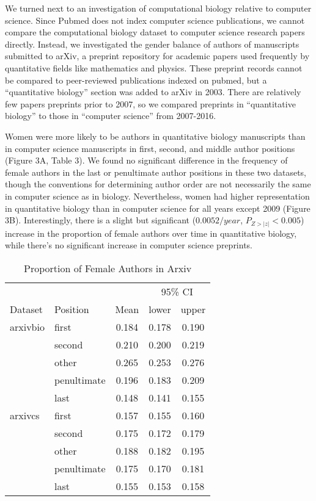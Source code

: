 \documentclass[10pt,letterpaper]{article}
\begin{document}
\begin{flushleft}
We turned next to an investigation of computational biology relative to computer science. Since Pubmed does not index computer science publications, we cannot compare the computational biology dataset to computer science research papers directly. Instead, we investigated the gender balance of authors of manuscripts submitted to arXiv, a preprint repository for academic papers used frequently by quantitative fields like mathematics and physics. These preprint records cannot be compared to peer-reviewed publications indexed on pubmed, but a “quantitative biology” section was added to arXiv in 2003. There are relatively few papers preprints prior to 2007, so we compared preprints in “quantitative biology” to those in “computer science” from 2007-2016.

Women were more likely to be authors in quantitative biology manuscripts than in computer science manuscripts in first, second, and middle author positions (Figure 3A, Table 3). We found no significant difference in the frequency of female authors in the last or penultimate author positions in these two datasets, though the conventions for determining author order are not necessarily the same in computer science as in biology. Nevertheless, women had higher representation in quantitative biology than in computer science for all years except 2009 (Figure 3B). Interestingly, there is a slight but significant ($0.0052 / year$, $P_{Z > |z|} < 0.005$) increase in the proportion of female authors over time in quantitative biology, while there’s no significant increase in computer science preprints.

\begin{table}[]
\centering
\caption{Proportion of Female Authors in Arxiv}
\label{Table 3}
\begin{tabular}{llccc}
\toprule
        &                  &       & \multicolumn{2}{c}{95\% CI} \\
\cmidrule(r){4-5}
Dataset      & Position    & Mean  & lower        & upper        \\
\midrule
arxivbio     & first       & 0.184 & 0.178        & 0.190        \\
             & second      & 0.210 & 0.200        & 0.219        \\
             & other       & 0.265 & 0.253        & 0.276        \\
             & penultimate & 0.196 & 0.183        & 0.209        \\
             & last        & 0.148 & 0.141        & 0.155        \\
arxivcs      & first       & 0.157 & 0.155        & 0.160        \\
             & second      & 0.175 & 0.172        & 0.179        \\
             & other       & 0.188 & 0.182        & 0.195        \\
             & penultimate & 0.175 & 0.170        & 0.181        \\
             & last        & 0.155 & 0.153        & 0.158        \\
\bottomrule
\end{tabular}
\end{table}


\end{flushleft}
\end{document}
